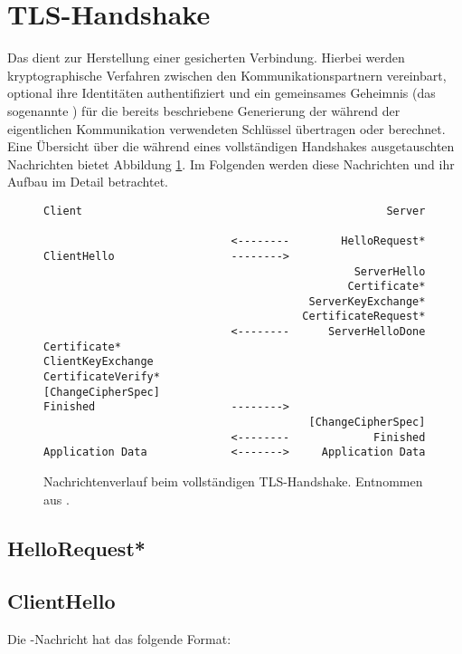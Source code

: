 \section{TLS-Handshake}

Das \handshakeprotocol{} dient zur Herstellung einer gesicherten Verbindung. Hierbei werden kryptographische Verfahren zwischen den Kommunikationspartnern vereinbart, optional ihre Identitäten authentifiziert und ein gemeinsames Geheimnis (das sogenannte \premastersecret{}) für die bereits beschriebene Generierung der während der eigentlichen Kommunikation verwendeten Schlüssel übertragen oder berechnet. Eine Übersicht über die während eines vollständigen Handshakes ausgetauschten Nachrichten bietet Abbildung \ref{fig_complete_handshake}. Im Folgenden werden diese Nachrichten und ihr Aufbau im Detail betrachtet.


\begin{figure}[]%
	\centering
	\begin{lstlisting}
Client                                               Server

                             <--------        HelloRequest*
ClientHello                  -------->
                                                ServerHello
                                               Certificate*
                                         ServerKeyExchange*
                                        CertificateRequest*
                             <--------      ServerHelloDone
Certificate*
ClientKeyExchange
CertificateVerify*
[ChangeCipherSpec]
Finished                     -------->
                                         [ChangeCipherSpec]
                             <--------             Finished
Application Data             <------->     Application Data
	\end{lstlisting}
	\caption{Nachrichtenverlauf beim vollständigen TLS-Handshake. Entnommen aus \cite{tls12}.}
	\label{fig_complete_handshake}
\end{figure}

\subsection*{HelloRequest*}


\subsection*{ClientHello}
Die \clienthello{}-Nachricht hat das folgende Format:

